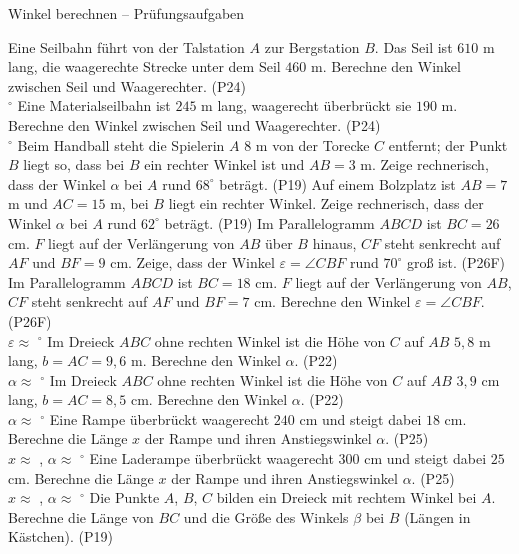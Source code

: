 \begin{aufgabe}{Winkel berechnen – Prüfungsaufgaben}
\begin{teile}
\teil Eine Seilbahn führt von der Talstation $A$ zur Bergstation $B$. Das Seil ist $610$ m lang, die waagerechte Strecke unter dem Seil $460$ m. Berechne den Winkel zwischen Seil und Waagerechter. \hfill (P24) \\ \leerfeld $^\circ$
\teil Eine Materialseilbahn ist $245$ m lang, waagerecht überbrückt sie $190$ m. Berechne den Winkel zwischen Seil und Waagerechter. \hfill (P24) \\ \leerfeld $^\circ$
\teil Beim Handball steht die Spielerin $A$ $8$ m von der Torecke $C$ entfernt; der Punkt $B$ liegt so, dass bei $B$ ein rechter Winkel ist und $AB = 3$ m. Zeige rechnerisch, dass der Winkel $\alpha$ bei $A$ rund $68^\circ$ beträgt. \hfill (P19)
\teil Auf einem Bolzplatz ist $AB = 7$ m und $AC = 15$ m, bei $B$ liegt ein rechter Winkel. Zeige rechnerisch, dass der Winkel $\alpha$ bei $A$ rund $62^\circ$ beträgt. \hfill (P19)
\teil Im Parallelogramm $ABCD$ ist $BC = 26$ cm. $F$ liegt auf der Verlängerung von $AB$ über $B$ hinaus, $CF$ steht senkrecht auf $AF$ und $BF = 9$ cm. Zeige, dass der Winkel $\varepsilon = \angle CBF$ rund $70^\circ$ groß ist. \hfill (P26F)
\teil Im Parallelogramm $ABCD$ ist $BC = 18$ cm. $F$ liegt auf der Verlängerung von $AB$, $CF$ steht senkrecht auf $AF$ und $BF = 7$ cm. Berechne den Winkel $\varepsilon = \angle CBF$. \hfill (P26F) \\ $\varepsilon \approx$ \leerfeld $^\circ$
\teil Im Dreieck $ABC$ ohne rechten Winkel ist die Höhe von $C$ auf $AB$ $5{,}8$ m lang, $b = AC = 9{,}6$ m. Berechne den Winkel $\alpha$. \hfill (P22) \\ $\alpha \approx$ \leerfeld $^\circ$
\teil Im Dreieck $ABC$ ohne rechten Winkel ist die Höhe von $C$ auf $AB$ $3{,}9$ cm lang, $b = AC = 8{,}5$ cm. Berechne den Winkel $\alpha$. \hfill (P22) \\ $\alpha \approx$ \leerfeld $^\circ$
\teil Eine Rampe überbrückt waagerecht $240$ cm und steigt dabei $18$ cm. Berechne die Länge $x$ der Rampe und ihren Anstiegswinkel $\alpha$. \hfill (P25) \\ $x \approx$ \leerfeld[cm] , $\alpha \approx$ \leerfeld $^\circ$
\teil Eine Laderampe überbrückt waagerecht $300$ cm und steigt dabei $25$ cm. Berechne die Länge $x$ der Rampe und ihren Anstiegswinkel $\alpha$. \hfill (P25) \\ $x \approx$ \leerfeld[cm] , $\alpha \approx$ \leerfeld $^\circ$
\teil Die Punkte $A$, $B$, $C$ bilden ein Dreieck mit rechtem Winkel bei $A$. Berechne die Länge von $BC$ und die Größe des Winkels $\beta$ bei $B$ (Längen in Kästchen). \hfill (P19) \\


\end{teile}
\end{aufgabe}
